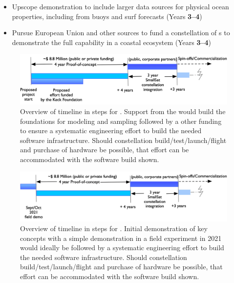\begin{itemize}[noitemsep,topsep=0pt,parsep=5pt,partopsep=10pt]
\item Upscope demonstration to include larger data sources for
  physical ocean properties, including from buoys and surf forecasts
  (Years \textbf{3--4})


\item Pursue European Union and other sources to fund a constellation
  of \smle s to demonstrate the full capability in a coastal ecosystem
  (Years \textbf{3--4})
  
\end{itemize}

\fi

\ifkeck
\begin{figure}[!t]
  \centering
  \includegraphics[scale=0.19]{fig/timeline-keck.jpg}
  \caption{Overview of timeline in steps for \proe. Support from the
    \kck would build the foundations for modeling and sampling
    followed by a other funding to ensure a systematic engineering
    effort to build the needed software infrastructure. Should \sml
    constellation build/test/launch/flight and purchase of hardware be
    possible, that effort can be accommodated with the software build
    shown.}
  \label{fig:timeline}
\end{figure}

\else

\begin{figure}[!t]
  \centering
  \includegraphics[scale=0.22]{fig/timeline.jpg}
  \caption{Overview of timeline in steps for \proe. Initial
    demonstration of key concepts with a simple demonstration in a
    field experiment in 2021 would ideally be followed by a systematic
    engineering effort to build the needed software
    infrastructure. Should \sml constellation build/test/launch/flight
    and purchase of hardware be possible, that effort can be
    accommodated with the software build shown.}
  \label{fig:timeline}
\end{figure}

